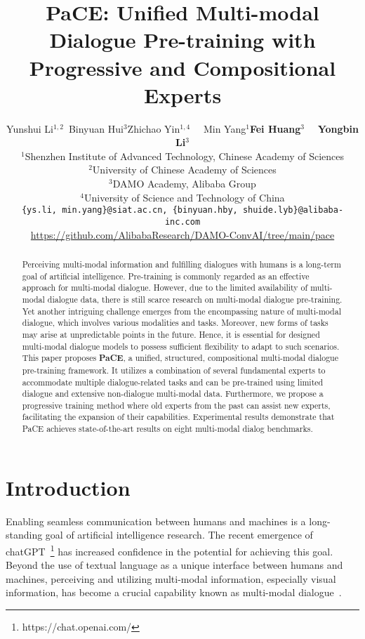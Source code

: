 \documentclass[11pt]{article}
\title{PaCE: Unified Multi-modal Dialogue Pre-training with \\
Progressive and Compositional Experts}
\author{Yunshui Li$^{1,2}$\footnotemark[1]\ \footnotemark[2] \quad  Binyuan Hui$^{3}$\footnotemark[1] \quad Zhichao Yin$^{1,4}$ \ \   Min Yang$^{1}$\footnotemark[3] \quad \textbf{Fei Huang}$^{3}$ \ \  \textbf{Yongbin Li}$^{3}$\footnotemark[3] \\
        $^{1}$Shenzhen Institute of Advanced Technology, Chinese Academy of Sciences \\
        $^{2}$University of Chinese Academy of Sciences \\
        $^{3}$DAMO Academy, Alibaba Group\\
        $^{4}$University of Science and Technology of China\\
        \texttt{\{ys.li, min.yang\}@siat.ac.cn, \{binyuan.hby, shuide.lyb\}@alibaba-inc.com}\\
        \small\url{https://github.com/AlibabaResearch/DAMO-ConvAI/tree/main/pace}
        }
\begin{document}
\maketitle


\renewcommand{\thefootnote}{\fnsymbol{footnote}}

\renewcommand{\thefootnote}{\arabic{footnote}}

\begin{abstract}
Perceiving multi-modal information and fulfilling dialogues with humans is a long-term goal of artificial intelligence. Pre-training is commonly regarded as an effective approach for multi-modal dialogue. However, due to the limited availability of multi-modal dialogue data, there is still scarce research on multi-modal dialogue pre-training. Yet another intriguing challenge emerges from the encompassing nature of multi-modal dialogue, which involves various modalities and tasks. Moreover, new forms of tasks may arise at unpredictable points in the future. Hence, it is essential for designed multi-modal dialogue models to possess sufficient flexibility to adapt to such scenarios. 
This paper proposes \textbf{PaCE}, a unified, structured, compositional multi-modal dialogue pre-training framework. It utilizes a combination of several fundamental experts to accommodate multiple dialogue-related tasks and can be pre-trained using limited dialogue and extensive non-dialogue multi-modal data. Furthermore, we propose a progressive training method where old experts from the past can assist new experts, facilitating the expansion of their capabilities. 
Experimental results demonstrate that PaCE achieves state-of-the-art results on eight multi-modal dialog benchmarks.

\end{abstract}

\section{Introduction}


Enabling seamless communication between humans and machines is a long-standing goal of artificial intelligence research.
The recent emergence of chatGPT~\footnote{https://chat.openai.com/} has increased confidence in the potential for achieving this goal. 
Beyond the use of textual language as a unique interface between humans and machines, perceiving and utilizing multi-modal information, especially visual information, has become a crucial capability known as multi-modal dialogue~\citep{shuster2020multi,sun2021multimodal}.
\end{document}

